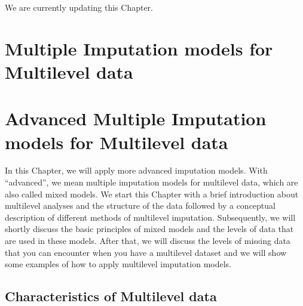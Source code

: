 \documentclass[]{book}
\begin{document}
We are currently updating this Chapter.

\chapter{Multiple Imputation models for Multilevel
data}\label{multiple-imputation-models-for-multilevel-data}

\chapter{Advanced Multiple Imputation models for Multilevel
data}\label{advanced-multiple-imputation-models-for-multilevel-data}

In this Chapter, we will apply more advanced imputation models. With
``advanced'', we mean multiple imputation models for multilevel data,
which are also called mixed models. We start this Chapter with a brief
introduction about multilevel analyses and the structure of the data
followed by a conceptual description of different methods of multilevel
imputation. Subsequently, we will shortly discuss the basic principles
of mixed models and the levels of data that are used in these models.
After that, we will discuss the levels of missing data that you can
encounter when you have a multilevel dataset and we will show some
examples of how to apply multilevel imputation models.

\section{Characteristics of Multilevel
data}\label{characteristics-of-multilevel-data}
\end{document}
